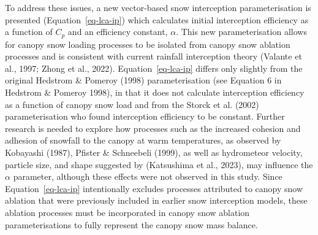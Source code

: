 \documentclass[
  letterpaper,
]{tex/uofsthesis-cs}
\begin{document}
To address these issues, a new vector-based snow interception
parameterisation is presented (Equation~\ref{eq-lca-ip}) which
calculates initial interception efficiency as a function of \(C_p\) and
an efficiency constant, \(\alpha\). This new parameterisation allows for
canopy snow loading processes to be isolated from canopy snow ablation
processes and is consistent with current rainfall interception theory
(Valante et al., 1997; Zhong et al., 2022). Equation~\ref{eq-lca-ip}
differs only slightly from the original Hedstrom \& Pomeroy (1998)
parameterisation (see Equation 6 in Hedstrom \& Pomeroy 1998), in that
it does not calculate interception efficiency as a function of canopy
snow load and from the Storck et al. (2002) parameterisation who found
interception efficiency to be constant. Further research is needed to
explore how processes such as the increased cohesion and adhesion of
snowfall to the canopy at warm temperatures, as observed by Kobayashi
(1987), Pfister \& Schneebeli (1999), as well as hydrometeor velocity,
particle size, and shape suggested by (Katsushima et al., 2023), may
influence the \(\alpha\) parameter, although these effects were not
observed in this study. Since Equation~\ref{eq-lca-ip} intentionally
excludes processes attributed to canopy snow ablation that were
previously included in earlier snow interception models, these ablation
processes must be incorporated in canopy snow ablation parameterisations
to fully represent the canopy snow mass balance.
\end{document}
